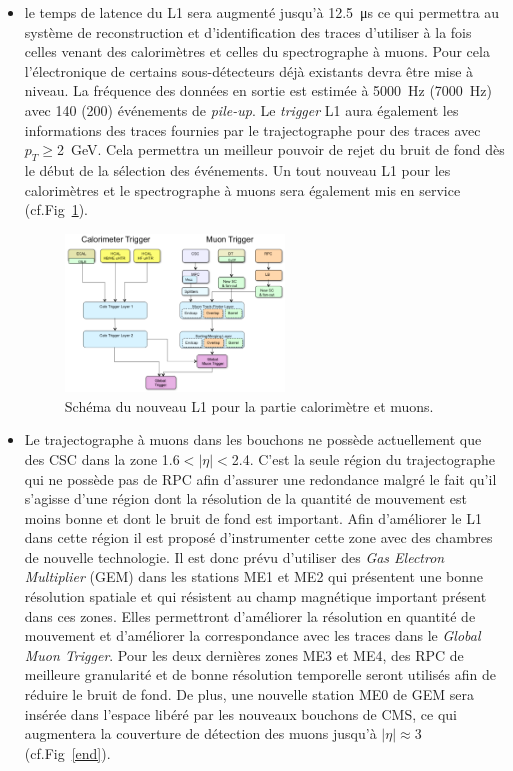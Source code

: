\begin{itemize}[label=$\bullet$]
	\item le temps de latence du L1 sera augmenté jusqu'à \SI{12.5}{\micro\second} ce qui permettra au système de reconstruction et d'identification des traces d'utiliser à la fois celles venant des calorimètres et celles du spectrographe à muons. Pour cela l'électronique de certains sous-détecteurs déjà existants devra être mise à niveau. La fréquence des données en sortie est estimée à \SI{5000}{\hertz} (\SI{7000}{\hertz}) avec \num{140} (\num{200}) événements de \textit{pile-up}. Le \textit{trigger} L1 aura également les informations des traces fournies par le trajectographe pour des traces avec $p_{T}\geq$\SI{2}{\giga\eV}. Cela permettra un meilleur pouvoir de rejet du bruit de fond dès le début de la sélection des événements. Un tout nouveau L1 pour les calorimètres et le spectrographe à muons sera également mis en service (cf.Fig~\ref{L1_2}).
	\begin{figure}[ht!]
		\centering
		\includegraphics[width=0.55\textwidth]{CMS/L1_2.png}
		\captionsetup{type=figure}\caption{Schéma du nouveau L1 pour la partie calorimètre et muons.}
		\label{L1_2}
	\end{figure}
\item Le trajectographe à muons dans les bouchons ne possède actuellement que des CSC dans la zone \num{1.6}$<|\eta|<$\num{2.4}. C'est la seule région du trajectographe qui ne possède pas de RPC afin d'assurer une redondance malgré le fait qu'il s'agisse d'une région dont la résolution de la quantité de mouvement est moins bonne et dont le bruit de fond est important. Afin d'améliorer le L1 dans cette région il est proposé d'instrumenter cette zone avec des chambres de nouvelle technologie. Il est donc prévu d'utiliser des \textit{Gas Electron Multiplier} (GEM) dans les stations ME1 et ME2 qui présentent une bonne résolution spatiale et qui résistent au champ magnétique important présent dans ces zones. Elles permettront d'améliorer la résolution en quantité de mouvement et d'améliorer la correspondance avec les traces dans le \textit{Global Muon Trigger}. Pour les deux dernières zones ME3 et ME4, des RPC de meilleure granularité et de bonne résolution temporelle seront utilisés afin de réduire le bruit de fond.  De plus, une nouvelle station ME0 de GEM sera insérée dans l'espace libéré par les nouveaux bouchons de CMS, ce qui augmentera la couverture de détection des muons jusqu'à $|\eta|\approx$\num{3} (cf.Fig~\ref{end}). 

\end{itemize}
